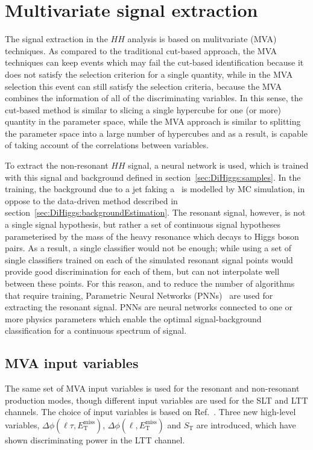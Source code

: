 \newpage
\section{Multivariate signal extraction}
\label{sec:DiHiggs:MVA}
The signal extraction in the $HH$ analysis is based on mulitvariate (MVA) techniques.
As compared to the traditional cut-based approach, the MVA techniques can keep events
which may fail the cut-based identification because it does not satisfy 
the selection criterion for a single quantity, 
while in the MVA selection this event can
still satisfy the selection criteria, 
because the MVA combines the information of all of the discriminating variables.
In this sense, the cut-based method is similar to slicing a single hypercube for
one (or more) quantity in the parameter space, while the MVA approach is similar to
splitting the parameter space into a large number of hypercubes and 
as a result, is capable of taking account of the correlations between variables.


To extract the non-resonant $HH$ signal, a neural network is used, 
which is trained with this signal and background defined 
in section~\ref{sec:DiHiggs:samples}. In the training, 
the background due to a jet faking a \tauhad\ is modelled 
by MC simulation, in oppose to the data-driven method described
in section~\ref{sec:DiHiggs:backgroundEstimation}.
The resonant signal, however, is not a single signal hypothesis, 
but rather a set of continuous signal hypotheses parameterised by 
the mass of the heavy resonance which decays to Higgs boson pairs.
As a result, a single classifier would not be enough;
while using a set of single classifiers trained on 
each of the simulated resonant signal points 
would provide good discrimination for each of them, 
but can not interpolate well between these points.
For this reason, and to reduce the number of algorithms 
that require training, 
Parametric Neural Networks (PNNs)~\cite{Baldi:2016fzo} are used  
for extracting the resonant signal. 
PNNs are neural networks connected to one or more physics parameters
which enable the optimal signal-background classification
for a continuous spectrum of signal. 

\subsection{MVA input variables}
The same set of MVA input variables is used for the resonant and non-resonant production modes, 
though different input variables are used for the SLT and LTT channels.
The choice of input variables is based on Ref.~\cite{HIGG-2016-16}.
Three new high-level variables, $\Delta\phi(\ell\tau, E_\text{T}^\text{miss})$,
$\Delta\phi(\ell, E_\text{T}^\text{miss})$ and 
$S_\text{T}$ are introduced, which have shown 
discriminating power in the LTT channel. 

